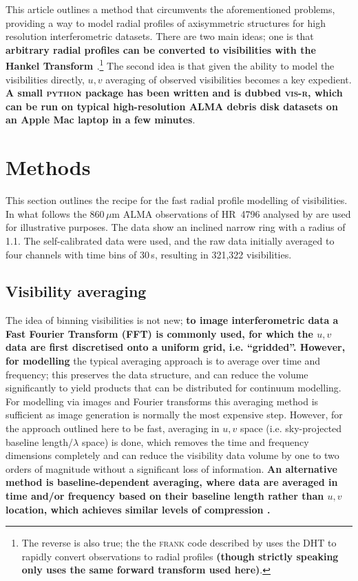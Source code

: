 \documentclass[fleqn,usenatbib]{mnras}
\begin{document}
This article outlines a method that circumvents the aforementioned problems, providing a way to model radial profiles of axisymmetric structures for high resolution interferometric datasets. There are two main ideas; one is that \textbf{arbitrary radial profiles can be converted to visibilities with the Hankel Transform \citep[in this case the Discrete transform, or DHT,][]{1987CoPhC..43..181J,1994JChPh.101.3936L,2015JOSAA..32..611B}}.\footnote{The reverse is also true; the the \textsc{frank} code described by \citet{2020MNRAS.tmp.1491J} uses the DHT to rapidly convert observations to radial profiles \textbf{(though strictly speaking only uses the same forward transform used here)}.} The second idea is that given the ability to model the visibilities directly, $u,v$ averaging of observed visibilities becomes a key expedient. \textbf{A small \textsc{python} package has been written and is dubbed \textsc{vis-r}, which can be run on typical high-resolution ALMA debris disk datasets on an Apple Mac laptop in a few minutes}.

\section{Methods}

This section outlines the recipe for the fast radial profile modelling of visibilities. In what follows the 860\,$\mu$m ALMA observations of HR~4796 analysed by \citet{2018MNRAS.475.4924K} are used for illustrative purposes. The data show an inclined narrow ring with a radius of 1.1\arcsec. The self-calibrated data were used, and the raw data initially averaged to four channels with time bins of 30\,s, resulting in 321,322 visibilities.

\subsection{Visibility averaging}\label{sec:avg}

The idea of binning visibilities is not new; \textbf{to image interferometric data a Fast Fourier Transform (FFT) is commonly used, for which the $u,v$ data are first discretised onto a uniform grid, i.e. ``gridded''. However, for modelling} the typical averaging approach is to average over time and frequency; this preserves the data structure, and can reduce the volume significantly to yield products that can be distributed for continuum modelling. For modelling via images and Fourier transforms this averaging method is sufficient as image generation is normally the most expensive step. However, for the approach outlined here to be fast, averaging in $u,v$ space (i.e. sky-projected baseline length$/\lambda$ space) is done, which removes the time and frequency dimensions completely and can reduce the visibility data volume by one to two orders of magnitude without a significant loss of information. \textbf{An alternative method is baseline-dependent averaging, where data are averaged in time and/or frequency based on their baseline length rather than $u,v$ location, which achieves similar levels of compression \citep{2018MNRAS.476.2029W}.}
\end{document}
